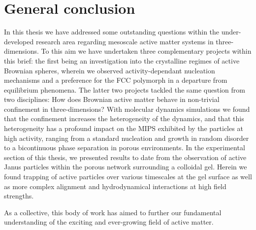 \section{General conclusion}

In this thesis we have addressed some outstanding questions within the under-developed research area regarding mesoscale active matter systems in three-dimensions. To this aim we have undertaken three complementary projects within this brief: the first being an investigation into the crystalline regimes of active Brownian spheres, wherein we observed activity-dependant nucleation mechanisms and a preference for the FCC polymorph in a departure from equilibrium phenomena. The latter two projects tackled the same question from two disciplines: How does Brownian active matter behave in non-trivial confinement in three-dimensions? With molecular dynamics simulations we found that the confinement increases the heterogeneity of the dynamics, and that this heterogeneity has a profound impact on the MIPS exhibited by the particles at high activity, ranging from a standard nucleation and growth in random disorder to a bicontinuous phase separation in porous environments. In the experimental section of this thesis, we presented results to date from the observation of active Janus particles within the porous network surrounding a colloidal gel. Herein we found trapping of active particles over various timescales at the gel surface as well as more complex alignment and hydrodynamical interactions at high field strengths.

As a collective, this body of work has aimed to further our fundamental understanding of the exciting and ever-growing field of active matter.






